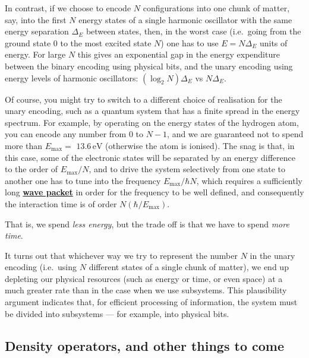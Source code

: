 \documentclass[fleqn,a4paper]{article}
\theoremstyle{definition}
\theoremstyle{definition}
\theoremstyle{definition}
\theoremstyle{definition}
\theoremstyle{remark}
\begin{document}
In contrast, if we choose to encode \(N\) configurations into one chunk of matter, say, into the first \(N\) energy states of a single harmonic oscillator with the same energy separation \(\Delta_E\) between states, then, in the worst case (i.e.~going from the ground state \(0\) to the most excited state \(N\)) one has to use \(E=N\Delta_E\) units of energy.
For large \(N\) this gives an exponential gap in the energy expenditure between the binary encoding using physical bits, and the unary encoding using energy levels of harmonic oscillators: \((\log_2 N)\Delta_E\) vs \(N\Delta_E\).

Of course, you might try to switch to a different choice of realisation for the unary encoding, such as a quantum system that has a finite spread in the energy spectrum.
For example, by operating on the energy states of the hydrogen atom, you can encode any number from \(0\) to \(N-1\), and we are guaranteed not to spend more than \(E_{\mathrm{max}}=\) \(13.6\,\mathrm{eV}\) (otherwise the atom is ionised).
The snag is that, in this case, some of the electronic states will be separated by an energy difference to the order of \(E_{\mathrm{max}}/N\), and to drive the system selectively from one state to another one has to tune into the frequency \(E_{\mathrm{max}}/\hbar N\), which requires a sufficiently long \href{https://en.wikipedia.org/wiki/Wave_packet}{\textbf{wave packet}} in order for the frequency to be well defined, and consequently the
interaction time is of order \(N(\hbar/E_{\mathrm{max}})\).

That is, we spend \emph{less energy}, but the trade off is that we have to spend \emph{more time}.

It turns out that whichever way we try to represent the number \(N\) in the unary encoding (i.e.~using \(N\) different states of a single chunk of matter), we end up depleting our physical resources (such as energy or time, or even space) at a much greater rate than in the case when we use subsystems.
This plausibility argument indicates that, for efficient processing of information, the system must be divided into subsystems --- for example, into physical bits.

\hypertarget{density-operators-and-other-things-to-come}{%
\subsection{Density operators, and other things to come}\label{density-operators-and-other-things-to-come}}
\end{document}
